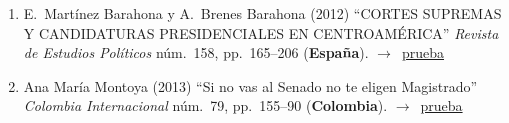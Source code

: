 \documentclass[12 pt, letter]{article}
\newenvironment{CitasMiTrabajo}{
    \begin{footnotesize}
    \begin{enumerate}[label={\footnotesize\emph{cita~\arabic*}},ref=\arabic*] %
        \setlength{\itemsep}{.1\itemsep}
        \setlength{\parskip}{.1\parskip}
    }{\end{enumerate}\end{footnotesize}}
\begin{document}
\begin{CitasMiTrabajo}
        \item E.~Mart\'inez Barahona y A.~Brenes Barahona (2012) ``CORTES SUPREMAS Y CANDIDATURAS PRESIDENCIALES EN CENTROAM\'ERICA'' \emph{Revista de Estudios Pol\'iticos} n\'um.~158, pp.~165--206 (\textbf{Espa\~na}). $\rightarrow$~\href{http://ericmagar.com/cv/cites/sanchMagalMagarChapter/mtnzBarahonaCortesCandPres2012rep.pdf}{prueba}

        \item Ana Mar\'ia Montoya (2013) ``Si no vas al Senado no te eligen Magistrado'' \emph{Colombia Internacional} n\'um.~79, pp.~155--90 (\textbf{Colombia}). $\rightarrow$~\href{http://ericmagar.com/cv/cites/sanchMagalMagarChapter/montoya2013.pdf}{prueba}

        \label{ncites:sanchez.magaloni.magar.2011} %

        
        \end{CitasMiTrabajo}





\end{document}
